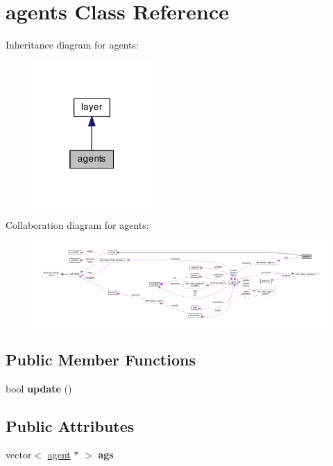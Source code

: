 \hypertarget{classagents}{}\section{agents Class Reference}
\label{classagents}


Inheritance diagram for agents\+:
\nopagebreak
\begin{figure}[H]
\begin{center}
\leavevmode
\includegraphics[width=127pt]{classagents__inherit__graph}
\end{center}
\end{figure}


Collaboration diagram for agents\+:
\nopagebreak
\begin{figure}[H]
\begin{center}
\leavevmode
\includegraphics[width=350pt]{classagents__coll__graph}
\end{center}
\end{figure}
\subsection*{Public Member Functions}
\begin{DoxyCompactItemize}
\item 
\mbox{\label{classagents_a90630d810c0ced5db4c190ed52720f9d}} 
bool {\bfseries update} ()
\end{DoxyCompactItemize}
\subsection*{Public Attributes}
\begin{DoxyCompactItemize}
\item 
\mbox{\label{classagents_a550d3cd56fd72b1d1e8a454ef1b718fd}} 
vector$<$ \mbox{\hyperlink{classagent}{agent}} $\ast$ $>$ {\bfseries ags}
\end{DoxyCompactItemize}
